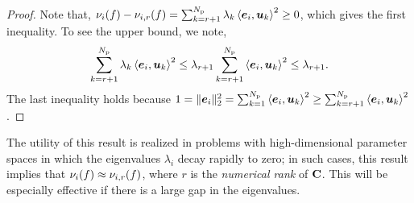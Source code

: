 \begin{proof} 


Note that, $\nu_i(f) - \act{f}{i}{r}= \sum_{k=r+1}^\Np \lambda_k \ip{\vec{e}_i}{\vec{u}_k}^2 \geq 0$,
which gives the first inequality. To see the upper bound, we note,
\[
   \sum_{k=r+1}^\Np \lambda_k \ip{\vec{e}_i}{\vec{u}_k}^2 \leq \lambda_{r+1} \sum_{k=r+1}^\Np \ip{\vec{e}_i}{\vec{u}_k}^2
   \leq \lambda_{r+1}. 
\]
The last inequality holds because 
$1 = \|\vec{e}_i\|_2^2 = 
\sum_{k = 1}^\Np \ip{\vec{e}_i}{\vec{u}_k}^2 
\geq \sum_{k=r+1}^\Np \ip{\vec{e}_i}{\vec{u}_k}^2$.
\end{proof} 
The utility of this result is realized in problems with 
high-dimensional parameter spaces in which 
the eigenvalues $\lambda_i$ decay rapidly to zero; in 
such cases, this result implies that  $\nu_i(f) \approx \act{f}{i}{r}$,
where $r$ is the \emph{numerical rank} of $\mat{C}$.  This will be especially
effective if there is a large gap in the eigenvalues.  


